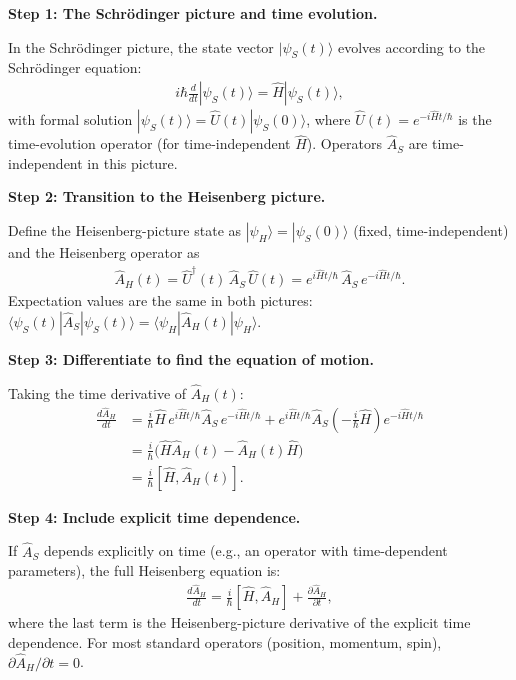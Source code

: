 \documentclass[11pt,openright]{book}
\begin{document}
\textbf{Step 1: The Schr\"odinger picture and time evolution.}

In the Schr\"odinger picture, the state vector $|\psi_S(t)\rangle$ evolves according to the Schr\"odinger equation:
\begin{align}
i\hbar\frac{d}{dt}|\psi_S(t)\rangle = \hat{H}|\psi_S(t)\rangle,
\end{align}
with formal solution $|\psi_S(t)\rangle = \hat{U}(t)|\psi_S(0)\rangle$, where $\hat{U}(t) = e^{-i\hat{H}t/\hbar}$ is the time-evolution operator (for time-independent $\hat{H}$). Operators $\hat{A}_S$ are time-independent in this picture.

\textbf{Step 2: Transition to the Heisenberg picture.}

Define the Heisenberg-picture state as $|\psi_H\rangle = |\psi_S(0)\rangle$ (fixed, time-independent) and the Heisenberg operator as
\begin{align}
\hat{A}_H(t) = \hat{U}^\dagger(t)\,\hat{A}_S\,\hat{U}(t) = e^{i\hat{H}t/\hbar}\,\hat{A}_S\,e^{-i\hat{H}t/\hbar}.
\end{align}
Expectation values are the same in both pictures: $\langle\psi_S(t)|\hat{A}_S|\psi_S(t)\rangle = \langle\psi_H|\hat{A}_H(t)|\psi_H\rangle$.

\textbf{Step 3: Differentiate to find the equation of motion.}

Taking the time derivative of $\hat{A}_H(t)$:
\begin{align}
\frac{d\hat{A}_H}{dt} &= \frac{i}{\hbar}\hat{H}\,e^{i\hat{H}t/\hbar}\hat{A}_S\,e^{-i\hat{H}t/\hbar} + e^{i\hat{H}t/\hbar}\hat{A}_S\left(-\frac{i}{\hbar}\hat{H}\right)e^{-i\hat{H}t/\hbar} \\
&= \frac{i}{\hbar}\bigl(\hat{H}\hat{A}_H(t) - \hat{A}_H(t)\hat{H}\bigr) \\
&= \frac{i}{\hbar}[\hat{H}, \hat{A}_H(t)].
\end{align}

\textbf{Step 4: Include explicit time dependence.}

If $\hat{A}_S$ depends explicitly on time (e.g., an operator with time-dependent parameters), the full Heisenberg equation is:
\begin{align}
\boxed{\frac{d\hat{A}_H}{dt} = \frac{i}{\hbar}[\hat{H}, \hat{A}_H] + \frac{\partial\hat{A}_H}{\partial t},}
\end{align}
where the last term is the Heisenberg-picture derivative of the explicit time dependence. For most standard operators (position, momentum, spin), $\partial\hat{A}_H/\partial t = 0$.
\end{document}
